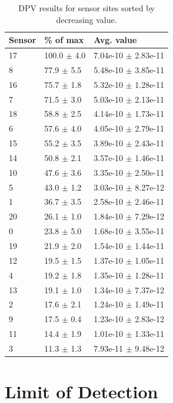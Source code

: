 \begin{table}
	\begin{tabular}{lll}
		Sensor & \% of max & Avg. value \\
		\hline
		17 & 100.0 $\pm$ 4.0 & 7.04e-10 $\pm$ 2.83e-11 \\
		8 & 77.9 $\pm$ 5.5 & 5.48e-10 $\pm$ 3.85e-11 \\
		16 & 75.7 $\pm$ 1.8 & 5.32e-10 $\pm$ 1.28e-11 \\
		7 & 71.5 $\pm$ 3.0 & 5.03e-10 $\pm$ 2.13e-11 \\
		18 & 58.8 $\pm$ 2.5 & 4.14e-10 $\pm$ 1.73e-11 \\
		6 & 57.6 $\pm$ 4.0 & 4.05e-10 $\pm$ 2.79e-11 \\
		15 & 55.2 $\pm$ 3.5 & 3.89e-10 $\pm$ 2.43e-11 \\
		14 & 50.8 $\pm$ 2.1 & 3.57e-10 $\pm$ 1.46e-11 \\
		10 & 47.6 $\pm$ 3.6 & 3.35e-10 $\pm$ 2.50e-11 \\
		5 & 43.0 $\pm$ 1.2 & 3.03e-10 $\pm$ 8.27e-12 \\
		1 & 36.7 $\pm$ 3.5 & 2.58e-10 $\pm$ 2.46e-11 \\
		20 & 26.1 $\pm$ 1.0 & 1.84e-10 $\pm$ 7.29e-12 \\
		0 & 23.8 $\pm$ 5.0 & 1.68e-10 $\pm$ 3.55e-11 \\
		19 & 21.9 $\pm$ 2.0 & 1.54e-10 $\pm$ 1.44e-11 \\
		12 & 19.5 $\pm$ 1.5 & 1.37e-10 $\pm$ 1.05e-11 \\
		4 & 19.2 $\pm$ 1.8 & 1.35e-10 $\pm$ 1.28e-11 \\
		13 & 19.1 $\pm$ 1.0 & 1.34e-10 $\pm$ 7.37e-12 \\
		2 & 17.6 $\pm$ 2.1 & 1.24e-10 $\pm$ 1.49e-11 \\
		9 & 17.5 $\pm$ 0.4 & 1.23e-10 $\pm$ 2.83e-12 \\
		11 & 14.4 $\pm$ 1.9 & 1.01e-10 $\pm$ 1.33e-11 \\
		3 & 11.3 $\pm$ 1.3 & 7.93e-11 $\pm$ 9.48e-12
	\end{tabular}
	\caption[DPV results for sensor sites.]{DPV results for sensor sites sorted by decreasing value.}
	\label{DPV results}
\end{table}

\section{Limit of Detection}

